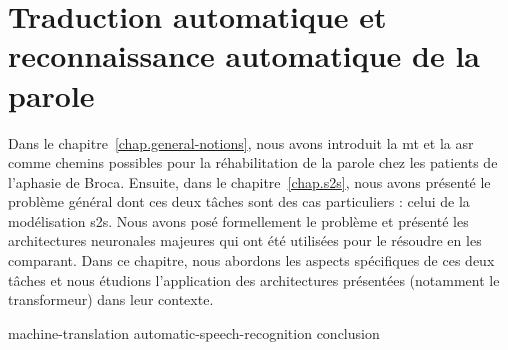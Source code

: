 \chapter{Traduction automatique et reconnaissance automatique de la parole}
\label{chap.mt-and-asr}

Dans le chapitre~\ref{chap.general-notions}, 
nous avons introduit la \gls{mt} et la \gls{asr} comme chemins possibles 
pour la réhabilitation de la parole chez les patients de l'aphasie de Broca.
Ensuite, dans le chapitre~\ref{chap.s2s}, nous avons présenté le problème général
dont ces deux tâches sont des cas particuliers : celui de la modélisation \gls{s2s}.
Nous avons posé formellement le problème 
et présenté les architectures neuronales majeures qui ont été utilisées pour le résoudre en les comparant.
Dans ce chapitre, nous abordons les aspects spécifiques de ces deux tâches
et nous étudions l'application des architectures présentées (notamment le transformeur) dans leur contexte.

{machine-translation}
{automatic-speech-recognition}
{conclusion}